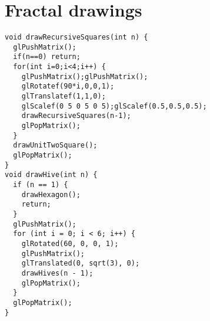 \documentclass[10pt,twocolumn]{extarticle}
\begin{document}
\section*{Fractal drawings}
\begin{lstlisting}
void drawRecursiveSquares(int n) {
  glPushMatrix();
  if(n==0) return;
  for(int i=0;i<4;i++) {
    glPushMatrix();glPushMatrix();
    glRotatef(90*i,0,0,1);
    glTranslatef(1,1,0);
    glScalef(0 5 0 5 0 5);glScalef(0.5,0.5,0.5);
    drawRecursiveSquares(n-1);
    glPopMatrix();
  }
  drawUnitTwoSquare();
  glPopMatrix();
}
void drawHive(int n) {
  if (n == 1) {
    drawHexagon();
    return;
  }
  glPushMatrix();
  for (int i = 0; i < 6; i++) {
    glRotated(60, 0, 0, 1);
    glPushMatrix();
    glTranslated(0, sqrt(3), 0);
    drawHives(n - 1);
    glPopMatrix();
  }
  glPopMatrix();
}
\end{lstlisting}
\end{document}
